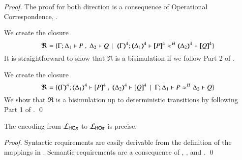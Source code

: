 \begin{proof}
	The proof for both direction is a consequence of Operational Correspondence,
	.


	\noi We create the closure
%
	\[
		\Re = \set{\horel{\Gamma}{\Delta_1}{P}{\ ,\ }{\Delta_2}{Q} \setbar \horel{\tmap{\Gamma}{4}}{\tmap{\Delta_1}{4}}{\pmap{P}{4}}{\wb}{\tmap{\Delta_2}{4}}{\pmap{Q}{4}}}
	\]
%
	\noi	It is straightforward to show that $\Re$ is a bisimulation if we follow Part 2 of
		.


	\noi We create the closure
%
	\[
		\Re = \set{\horel{\tmap{\Gamma}{4}}{\tmap{\Delta_1}{4}}{\pmap{P}{4}}{\ ,\ }{\tmap{\Delta_2}{4}}{\pmap{Q}{4}} \setbar \horel{\Gamma}{\Delta_1}{P}{\wb}{\Delta_2}{Q}}
	\]
%
	\noi	We show that $\Re$ is a bisimulation up to deterministic transitions
		by following Part 1 of .
	\qed
\end{proof}

\begin{proposition}\rm
	\label{prop:prec:pHOp_to_HOp}
	The encoding from $\tyl{L}_{\pHOp}$ to $\mathcal{L}_{\mathsf{HO}\pi}$
	is precise.
\end{proposition}

\begin{proof}
	Syntactic requirements are easily derivable from the
	definition of the mappings in .
	Semantic requirements are a consequence of
	, , and .
	\qed
\end{proof}


